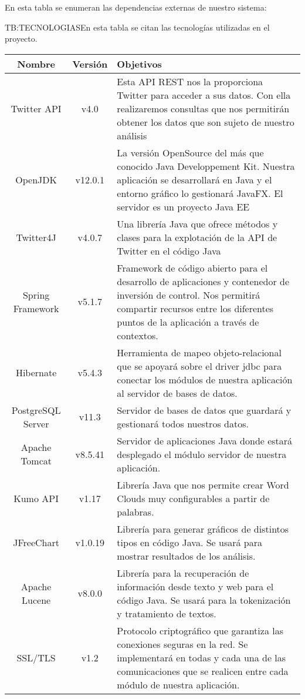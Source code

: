 En esta tabla se enumeran las dependencias externas de nuestro sistema:

\begin{table}[Tecnologías utilizadas]{TB:TECNOLOGIAS}{En esta tabla se citan las tecnologías utilizadas en el proyecto.}
  \begin{tabular}{|c|c|p{11cm}|}
    \hline
    \textbf{Nombre} & \textbf{Versión} & \textbf{Objetivos} \\
    \hline \hline
    Twitter API & v4.0 &Esta API REST nos la proporciona Twitter para acceder a sus datos. Con ella realizaremos consultas que nos permitirán obtener los datos que son sujeto de nuestro análisis \\
    OpenJDK& v12.0.1 &La versión OpenSource del más que conocido Java Developpement Kit. Nuestra aplicación se desarrollará en Java y el entorno gráfico lo gestionará JavaFX. El servidor es un proyecto Java EE\\
    Twitter4J & v4.0.7 & Una librería Java que ofrece métodos y clases para la explotación de la API de Twitter en el código Java\\
    Spring Framework & v5.1.7 & Framework de código abierto para el desarrollo de aplicaciones y contenedor de inversión de control. Nos permitirá compartir recursos entre los diferentes puntos de la aplicación a través de contextos. \\
	Hibernate & v5.4.3 & Herramienta de mapeo objeto-relacional que se apoyará sobre el driver jdbc para conectar los módulos de nuestra aplicación al servidor de bases de datos. \\
	PostgreSQL Server & v11.3 & Servidor de bases de datos que guardará y gestionará todos nuestros datos.\\
	Apache Tomcat & v8.5.41  & Servidor de aplicaciones Java donde estará desplegado el módulo servidor de nuestra aplicación. \\
	Kumo API & v1.17 & Librería Java que nos permite crear Word Clouds muy configurables a partir de palabras.\\
	JFreeChart & v1.0.19 & Librería para generar gráficos de distintos tipos en código Java. Se usará para mostrar resultados de los análisis. \\
	Apache Lucene & v8.0.0 & Librería para la recuperación de información desde texto y web para el código Java. Se usará para la tokenización y tratamiento de textos.\\
	SSL/TLS & v1.2 & Protocolo criptográfico que garantiza las conexiones seguras en la red. Se implementará en todas y cada una de las comunicaciones que se realicen entre cada módulo de nuestra aplicación.\\
    \hline
  \end{tabular}
\end{table}